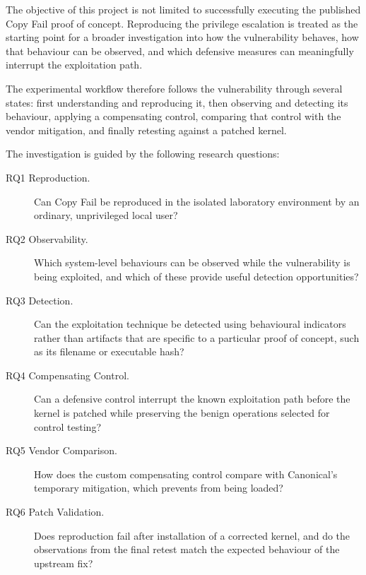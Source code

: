 The objective of this project is not limited to successfully executing the
published Copy Fail proof of concept. Reproducing the privilege escalation is
treated as the starting point for a broader investigation into how the
vulnerability behaves, how that behaviour can be observed, and which defensive
measures can meaningfully interrupt the exploitation path.

The experimental workflow therefore follows the vulnerability through several
states: first understanding and reproducing it, then observing and detecting its
behaviour, applying a compensating control, comparing that control with the
vendor mitigation, and finally retesting against a patched kernel.

The investigation is guided by the following research questions:

\begin{description}

    \item[RQ1 Reproduction.]
    Can Copy Fail be reproduced in the isolated laboratory environment by an
    ordinary, unprivileged local user?

    \item[RQ2 Observability.]
    Which system-level behaviours can be observed while the vulnerability is
    being exploited, and which of these provide useful detection opportunities?

    \item[RQ3 Detection.]
    Can the exploitation technique be detected using behavioural indicators
    rather than artifacts that are specific to a particular proof of concept,
    such as its filename or executable hash?

    \item[RQ4 Compensating Control.]
    Can a defensive control interrupt the known exploitation path before the
    kernel is patched while preserving the benign operations selected for
    control testing?

    \item[RQ5 Vendor Comparison.]
    How does the custom compensating control compare with Canonical's temporary
    mitigation, which prevents  from being loaded?

    \item[RQ6 Patch Validation.]
    Does reproduction fail after installation of a corrected kernel, and do the
    observations from the final retest match the expected behaviour of the
    upstream fix?

\end{description}

